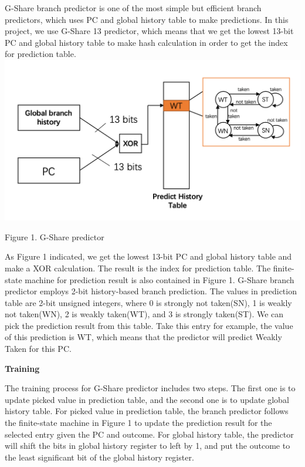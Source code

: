 \documentclass[conference]{IEEEtran}
\begin{document}
G-Share branch predictor is one of the most simple but efficient branch predictors, which uses PC and global history table to make predictions. In this project, we use G-Share 13 predictor, which means that 
we get the lowest 13-bit PC and global history table to make hash calculation in order to get the index for prediction table.
\includegraphics[width=\linewidth]{g-share.png}
\begin{center}
  {\small Figure 1. G-Share predictor}
\end{center}

As Figure 1 indicated, we get the lowest 13-bit PC and global history table and make a XOR calculation. The result is the index for prediction table.
The finite-state machine for prediction result is also contained in Figure 1. G-Share branch predictor employs 2-bit 
history-based branch prediction. The values in prediction table are 2-bit unsigned integers, 
where 0 is strongly not taken(SN), 1 is weakly not taken(WN), 2 is weakly taken(WT), and 3 is strongly taken(ST). We can pick the prediction result from this table. 
Take this entry for example, the value of this prediction is WT, which means that the predictor will predict Weakly Taken for this PC.

\begin{center}
  \textbf{Training}
\end{center}
The training process for G-Share predictor includes two steps. The first one is to update picked value in prediction table, and the second one is to update global history table. 
For picked value in prediction table, the branch predictor follows the finite-state machine in Figure 1 to update the prediction result for the selected entry given the PC and outcome. 
For global history table, the predictor will shift the bits in global history register to left by 1, and put the outcome to the least significant bit of the global history register. 
\end{document}
